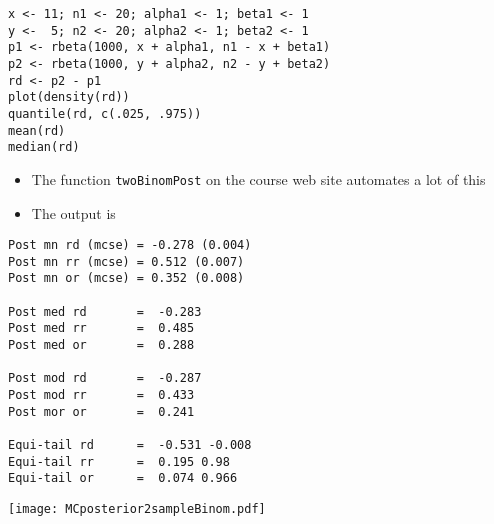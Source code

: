 \documentclass[aspectratio=169]{beamer}
\begin{document}
\begin{frame}[fragile]
\begin{verbatim}
x <- 11; n1 <- 20; alpha1 <- 1; beta1 <- 1
y <-  5; n2 <- 20; alpha2 <- 1; beta2 <- 1
p1 <- rbeta(1000, x + alpha1, n1 - x + beta1)
p2 <- rbeta(1000, y + alpha2, n2 - y + beta2)
rd <- p2 - p1
plot(density(rd))
quantile(rd, c(.025, .975))
mean(rd)
median(rd)
\end{verbatim}
\end{frame}

\begin{frame}[fragile]
  \begin{itemize}
  \item The function \texttt{twoBinomPost} on the course web site automates a lot of this
  \item The output is
  \end{itemize}
\begin{verbatim}
Post mn rd (mcse) = -0.278 (0.004)
Post mn rr (mcse) = 0.512 (0.007)
Post mn or (mcse) = 0.352 (0.008)

Post med rd       =  -0.283 
Post med rr       =  0.485 
Post med or       =  0.288 

Post mod rd       =  -0.287 
Post mod rr       =  0.433 
Post mor or       =  0.241 

Equi-tail rd      =  -0.531 -0.008 
Equi-tail rr      =  0.195 0.98 
Equi-tail or      =  0.074 0.966 
\end{verbatim}
\end{frame}

\begin{frame}
  \begin{center}
    \texttt{[image: MCposterior2sampleBinom.pdf]}
  \end{center}
\end{frame}
\end{document}
